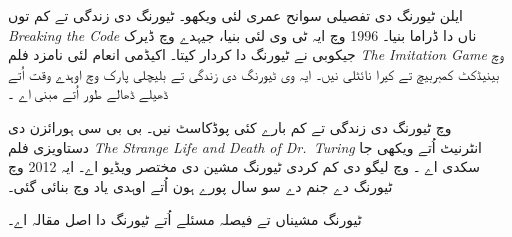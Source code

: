 \documentclass[../../../include/open-logic-section]{subfiles}
\begin{document}
\begin{reading}
ایلن ٹیورنگ دی تفصیلی سوانح عمری لئی \citet{Hodges2014} ویکھو۔ ٹیورنگ دی زندگی تے کم توں \emph{Breaking the Code} ناں دا ڈراما بنیا۔ 1996 وچ ایہ ٹی وی لئی بنیا، جیہدے وچ ڈیرک جیکوبی نے ٹیورنگ دا کردار کیتا۔ اکیڈمی انعام لئی نامزد فلم \emph{The Imitation Game} وچ بینیڈکٹ کمبربیچ تے کیرا نائٹلی نیں۔ ایہ وی ٹیورنگ دی زندگی تے بلیچلی پارک وچ اوہدے وقت اُتے ڈھیلے ڈھالے طور اُتے مبنی اے \citep{Imitation2014}۔

\citet{Radiolab2012} وچ ٹیورنگ دی زندگی تے کم بارے کئی پوڈکاسٹ نیں۔ بی بی سی ہورائزن دی دستاویزی فلم \emph{The Strange Life and Death of
  Dr.~Turing} انٹرنیٹ اُتے ویکھی جا سکدی اے \citep{Sykes1992}۔ \citep{Theelen2012} وچ لیگو دی کم کردی ٹیورنگ مشین دی مختصر ویڈیو اے۔ ایہ 2012 وچ ٹیورنگ دے جنم دے سو سال پورے ہون اُتے اوہدی یاد وچ بنائی گئی۔

ٹیورنگ مشیناں تے فیصلہ مسئلے اُتے ٹیورنگ دا اصل مقالہ \citet{Turing1937} اے۔
\end{reading}
\end{document}

